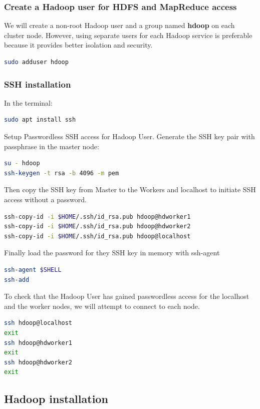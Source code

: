 \documentclass[12pt,english]{book}
\begin{document}
\subsubsection{Create a Hadoop user for HDFS and MapReduce access}


We will create a non-root Hadoop user and a group named \textbf{hdoop} on each cluster node. However, using separate users for each Hadoop service is preferable because it provides better isolation and security.
\begin{lstlisting}[language=bash, frame=single]
sudo adduser hdoop
\end{lstlisting}


\subsubsection{SSH installation}

In the terminal:

\begin{lstlisting}[language=bash, frame=single]
sudo apt install ssh
\end{lstlisting}

Setup Passwordless SSH access for Hadoop User.
Generate the SSH key pair with passphrase in the master node:
\begin{lstlisting}[language=bash, frame=single]
su - hdoop
ssh-keygen -t rsa -b 4096 -m pem
\end{lstlisting}
Then copy the SSH key from Master to the Workers and localhost to initiate SSH access without a password.
\begin{lstlisting}[language=bash, frame=single]
ssh-copy-id -i $HOME/.ssh/id_rsa.pub hdoop@hdworker1
ssh-copy-id -i $HOME/.ssh/id_rsa.pub hdoop@hdworker2
ssh-copy-id -i $HOME/.ssh/id_rsa.pub hdoop@localhost
\end{lstlisting}
Finally load the password for they SSH key in memory with ssh-agent
\begin{lstlisting}[language=bash, frame=single]
ssh-agent $SHELL
ssh-add
\end{lstlisting}
To check that the Hadoop User has gained passwordless access for the localhost and the worker nodes, we will attempt to connect to each node.
\begin{lstlisting}[language=bash, frame=single]
ssh hdoop@localhost
exit
ssh hdoop@hdworker1
exit
ssh hdoop@hdworker2
exit
\end{lstlisting}



\subsection{Hadoop installation}
\end{document}
